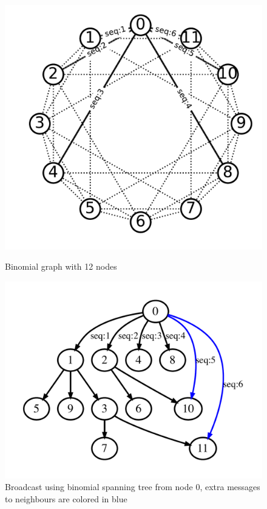 \documentclass[sigconf]{acmart}
\begin{document}
\begin{figure}[ht!]
  \begin{minipage}{.45\textwidth}
    \centering
    \includegraphics[scale=.3]{BMG_seq.pdf}
    \caption{Binomial graph with 12 nodes}
    \label{fig:bmg}
  \end{minipage}
  \begin{minipage}{.45\textwidth}
    \centering
    \includegraphics[scale=.3]{reorder_span.pdf}
    \caption{Broadcast using binomial spanning tree from node 0, extra messages to neighbours are colored in blue}
    \label{fig:reorder_span}
  \end{minipage}
\end{figure}
\end{document}
